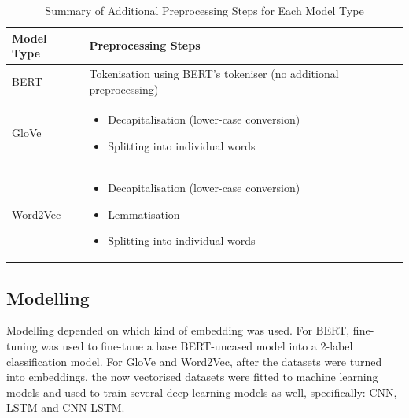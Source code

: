 \documentclass[stu,12pt,floatsintext,donotrepeattitle]{apa7}
\begin{document}
\begin{table}[H]
\centering
\caption{Summary of Additional Preprocessing Steps for Each Model Type}
\label{tab:preprocessing}
\begin{tabular}{@{}lp{10cm}@{}}
\toprule
\textbf{Model Type} & \textbf{Preprocessing Steps} \\
\midrule
BERT & Tokenisation using BERT's tokeniser (no additional preprocessing) \\
\addlinespace
GloVe & \begin{itemize}[leftmargin=*, nosep]
    \item Decapitalisation (lower-case conversion)
    \item Splitting into individual words
\end{itemize} \\
\addlinespace
Word2Vec & \begin{itemize}[leftmargin=*, nosep]
    \item Decapitalisation (lower-case conversion)
    \item Lemmatisation
    \item Splitting into individual words
\end{itemize} \\
\bottomrule
\end{tabular}
\end{table}

\subsection{Modelling}
Modelling depended on which kind of embedding was used. For BERT, fine-tuning was used to fine-tune a base BERT-uncased model into a 2-label classification model. For GloVe and Word2Vec, after the datasets were turned into embeddings, the now vectorised datasets were fitted to machine learning models and used to train several deep-learning models as well, specifically: CNN, LSTM and CNN-LSTM. 
\end{document}
